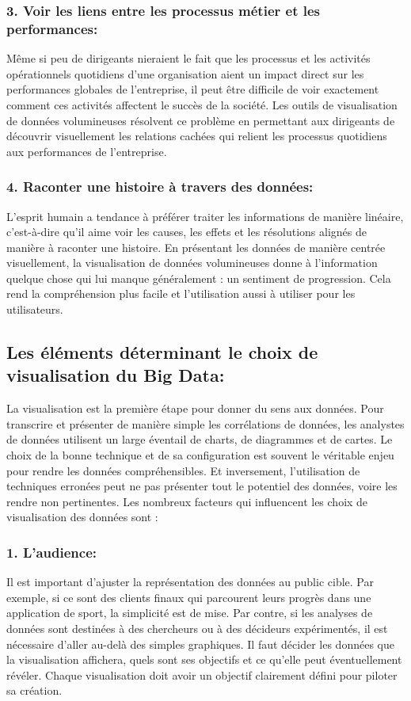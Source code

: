 \documentclass[french, a4paper, 12pt]{report}
\begin{document}
\subsubsection{3. Voir les liens entre les processus métier et les performances:}
Même si peu de dirigeants nieraient le fait que les processus et les activités opérationnels quotidiens d’une organisation aient un impact direct sur les performances globales de l’entreprise, il peut être difficile de voir exactement comment ces activités affectent le succès de la société. Les outils de visualisation de données volumineuses résolvent ce problème en permettant aux dirigeants de découvrir visuellement les relations cachées qui relient les processus quotidiens aux performances de l'entreprise.
\subsubsection{4. Raconter une histoire à travers des données:}
L'esprit humain a tendance à préférer traiter les informations de manière linéaire, c'est-à-dire qu'il aime voir les causes, les effets et les résolutions alignés de manière à raconter une histoire. En présentant les données de manière centrée visuellement, la visualisation de données volumineuses donne à l’information quelque chose qui lui manque généralement : un sentiment de progression. Cela rend la compréhension plus facile et l’utilisation aussi à utiliser pour les utilisateurs.
\subsection{Les éléments déterminant le choix de visualisation du Big Data:}
La visualisation est la première étape pour donner du sens aux données. Pour transcrire et présenter de manière simple les corrélations de données, les analystes de données utilisent un large éventail de charts, de diagrammes et de cartes. Le choix de la bonne technique et de sa configuration est souvent le véritable enjeu pour rendre les données compréhensibles. Et inversement, l’utilisation de techniques erronées peut ne pas présenter tout le potentiel des données, voire les rendre non pertinentes. Les nombreux facteurs qui influencent les choix de visualisation des données sont :
\subsubsection{1. L’audience:}
Il est important d’ajuster la représentation des données au public cible. Par exemple, si ce sont des clients finaux qui parcourent leurs progrès dans une application de sport, la simplicité est de mise. Par contre, si les analyses de données sont destinées à des chercheurs ou à des décideurs expérimentés, il est nécessaire d’aller au-delà des simples graphiques.
Il faut décider les données que la visualisation affichera, quels sont ses objectifs et ce qu’elle peut éventuellement révéler. Chaque visualisation doit avoir un objectif clairement défini pour piloter sa création.
\end{document}
